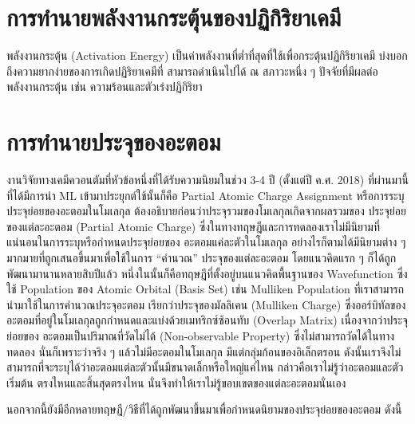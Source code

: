 \section{การทำนายพลังงานกระตุ้นของปฏิกิริยาเคมี}
\label{sec:pred_act_ener}

พลังงานกระตุ้น (Activation Energy) เป็นค่าพลังงานที่ต่ำที่สุดที่ใช้เพื่อกระตุ้นปฏิกิริยาเคมี บ่งบอกถึงความยากง่ายของการเกิดปฏิริยาเคมีที่%
สามารถดำเนินไปได้ ณ สภาวะหนึ่ง ๆ ปัจจัยที่มีผลต่อพลังงานกระตุ้น เช่น ความร้อนและตัวเร่งปฏิกิริยา

\section{การทำนายประจุของอะตอม}
\label{sec:pred_atomic_charge}

งานวิจัยทางเคมีควอนตัมที่หัวข้อหนึ่งที่ได้รับความนิยมในช่วง 3-4 ปี (ตั้งแต่ปี ค.ศ. 2018) ที่ผ่านมานี้ที่ได้มีการนำ ML เข้ามาประยุกต์ใช้นั้นก็คือ 
Partial Atomic Charge Assignment หรือการระบุประจุย่อยของอะตอมในโมเลกุล ต้องอธิบายก่อนว่าประจุรวมของโมเลกุลเกิดจากผลรวมของ%
ประจุย่อยของแต่ละอะตอม (Partial Atomic Charge) ซึ่งในทางทฤษฎีและการทดลองเราไม่มีนิยามที่แน่นอนในการระบุหรือกำหนดประจุย่อยของ%
อะตอมแค่ละตัวในโมเลกุล อย่างไรก็ตามได้มีนิยามต่าง ๆ มากมายที่ถูกเสนอขึ้นมาเพื่อใช้ในการ \enquote{คำนวณ} ประจุของแต่ละอะตอม 
โดยแนวคิดแรก ๆ ก็ได้ถูกพัฒนามานานหลายสิบปีแล้ว หนึ่งในนั้นก็คือทฤษฎีที่ตั้งอยู่บนแนวคิดพื้นฐานของ Wavefunction ซึ่งใช้ Population 
ของ Atomic Orbital (Basis Set) เช่น Mulliken Population ที่เราสามารถนำมาใช้ในการคำนวณประจุอะตอม เรียกว่าประจุของมัลลิเคน 
(Mulliken Charge) ซึ่งออร์บิทัลของอะตอมที่อยู่ในโมเลกุลถูกกำหนดและแบ่งด้วยเมทริกซ์ซ้อนทับ (Overlap Matrix) เนื่องจากว่าประจุย่อยของ%
อะตอมเป็นปริมาณที่วัดไม่ได้ (Non-observable Property) ซึ่งไม่สามารถวัดได้ในทางทดลอง นั่นก็เพราะว่าจริง ๆ แล้วไม่มีอะตอมในโมเลกุล 
มีแต่กลุ่มก้อนของอิเล็กตรอน ดังนั้นเราจึงไม่สามารถที่จะระบุได้ว่าอะตอมแต่ละตัวนั้นมีขนาดเล็กหรือใหญ่แค่ไหน กล่าวคือเราไม่รู้ว่าอะตอมและตัวเริ่มต้น%
ตรงไหนและสิ้นสุดตรงไหน นั่นจึงทำให้เราไม่รู้ขอบเขตของแต่ละอะตอมนั่นเอง

นอกจากนี้ยังมีอีกหลายทฤษฎี/วิธีที่ได้ถูกพัฒนาขึ้นมาเพื่อกำหนดนิยามของประจุย่อยของอะตอม ดังนี้

